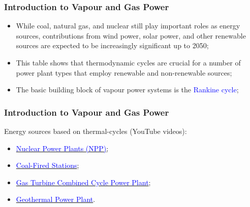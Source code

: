 \documentclass[10pt,compress,handout,ignorenonframetext]{beamer}
\begin{document}
\begin{frame}
 \frametitle{Introduction to Vapour and Gas Power}

    \begin{itemize}%
     \item <1-> While coal, natural gas, and nuclear still play important roles as energy sources, contributions from wind power, solar power, and other renewable sources are expected to be increasingly significant up to 2050;
     \item <2-> This table shows that thermodynamic cycles are crucial for a number of power plant types that employ renewable and non-renewable sources;
     \item <3-> The basic building block of vapour power systems is the \textcolor{blue}{Rankine cycle};
    \end{itemize}
 \normalsize
\end{frame}

\begin{frame}
 \frametitle{Introduction to Vapour and Gas Power}
Energy sources based on thermal-cycles (YouTube videos):
    \begin{itemize}%
     \item \href{http://www.youtube.com/watch?v=_UwexvaCMWA}{\textcolor{blue}{Nuclear Power Plants (NPP)}};
     \item \href{http://www.youtube.com/watch?v=0mjT8ETB128}{\textcolor{blue}{Coal-Fired Stations}};
     \item \href{http://www.youtube.com/watch?v=oi1TRbiE_Kw}{\textcolor{blue}{Gas Turbine Combined Cycle Power Plant}};
     \item \href{https://www.youtube.com/watch?v=kjpp2MQffnw}{\textcolor{blue}{Geothermal Power Plant}}.
    \end{itemize}
 \normalsize
\end{frame}
\end{document}
